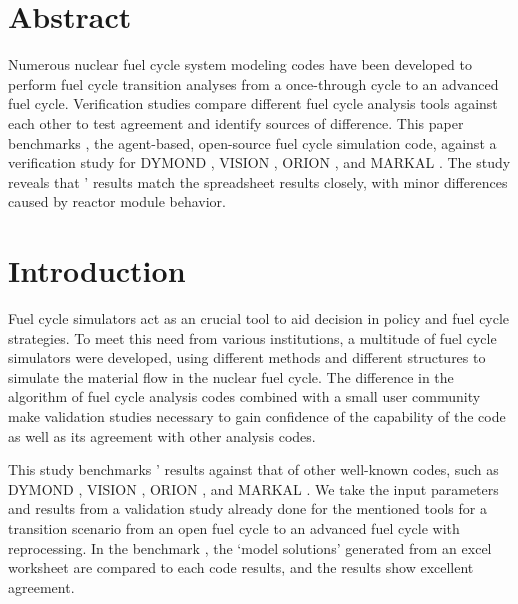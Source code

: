 \section{Abstract}
Numerous nuclear fuel cycle system modeling codes
have been developed to perform fuel cycle transition
analyses from a once-through cycle to an advanced
fuel cycle. Verification studies compare different
fuel cycle analysis tools against each other to
test agreement and identify sources of difference.
This paper benchmarks \Cyclus, the agent-based,
open-source fuel cycle simulation code, against
a verification study \cite{feng_standardized_2016} for
DYMOND \cite{yacout_modeling_2005},
VISION \cite{jacobson_verifiable_2010},
ORION \cite{gregg_analysis_2012}, and
MARKAL \cite{shay_epa_2006}. The study reveals
that \Cyclus' results match the spreadsheet results
closely, with minor differences caused by
reactor module behavior.

\section{Introduction}
Fuel cycle simulators act as an crucial tool to
aid decision in policy and fuel cycle strategies.
To meet this need from various institutions, a
multitude of fuel cycle simulators were developed,
using different methods and different structures
to simulate the material flow in the nuclear fuel cycle.
The difference in the algorithm of fuel cycle analysis
codes combined with a small user community make
validation studies necessary to gain
confidence of the capability of the code as well as its
agreement with other analysis codes.

This study benchmarks \Cyclus' results
against that of other well-known codes, such as
DYMOND \cite{yacout_modeling_2005},
VISION \cite{jacobson_verifiable_2010},
ORION \cite{gregg_analysis_2012}, and
MARKAL \cite{shay_epa_2006}. We take the input
parameters and results from a validation study
\cite{feng_standardized_2016} already done for the
mentioned tools for a transition scenario from an
open fuel cycle to an advanced fuel cycle with
reprocessing. In the benchmark \cite{feng_standardized_2016}, the `model solutions'
generated from an excel worksheet are compared
to each code results, and the results show
excellent agreement.


\subsection{\Cyclus}

